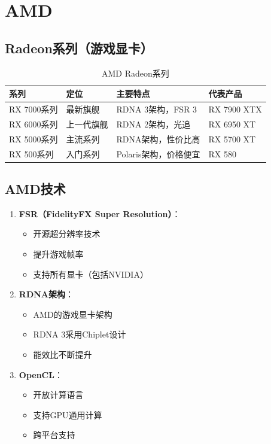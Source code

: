 \documentclass[12pt,UTF8]{ctexbook}
\begin{document}
\chapter{AMD}

\section{Radeon系列（游戏显卡）}

\begin{table}[H]
    \centering
    \begin{tabular}{|p{2cm}|p{3cm}|p{5cm}|p{3cm}|}
        \hline
        \textbf{系列} & \textbf{定位} & \textbf{主要特点} & \textbf{代表产品} \\
        \hline
        RX 7000系列 & 最新旗舰 & RDNA 3架构，FSR 3 & RX 7900 XTX \\
        \hline
        RX 6000系列 & 上一代旗舰 & RDNA 2架构，光追 & RX 6950 XT \\
        \hline
        RX 5000系列 & 主流系列 & RDNA架构，性价比高 & RX 5700 XT \\
        \hline
        RX 500系列 & 入门系列 & Polaris架构，价格便宜 & RX 580 \\
        \hline
    \end{tabular}
    \caption{AMD Radeon系列}
    \label{tab:amd_radeon}
\end{table}

\section{AMD技术}

\begin{enumerate}
    \item \textbf{FSR（FidelityFX Super Resolution）}：
    \begin{itemize}[leftmargin=2em]
        \item 开源超分辨率技术
        \item 提升游戏帧率
        \item 支持所有显卡（包括NVIDIA）
    \end{itemize}
    
    \item \textbf{RDNA架构}：
    \begin{itemize}[leftmargin=2em]
        \item AMD的游戏显卡架构
        \item RDNA 3采用Chiplet设计
        \item 能效比不断提升
    \end{itemize}
    
    \item \textbf{OpenCL}：
    \begin{itemize}[leftmargin=2em]
        \item 开放计算语言
        \item 支持GPU通用计算
        \item 跨平台支持
    \end{itemize}
\end{enumerate}
\end{document}
